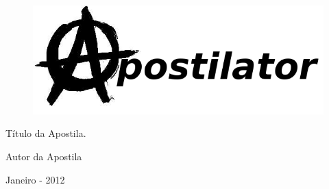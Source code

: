 \thispagestyle{empty}

\begin{center}
  \begin{figure}[H]
    \begin{center}
      \hspace{-1cm}
      \includegraphics[width=0.55\columnwidth]{titlepage.png}
    \end{center}      
  \end{figure}

  \vskip 2cm

  \hspace{-1cm}
  \begin{minipage}[c]{12cm}
    \begin{center}

{\huge \sf Título da Apostila.\vskip 0.15cm %

{\small Autor da Apostila} %
}
    \end{center}
  \end{minipage}

  \vskip 16cm

  {\huge Janeiro - 2012} %

\end{center}
